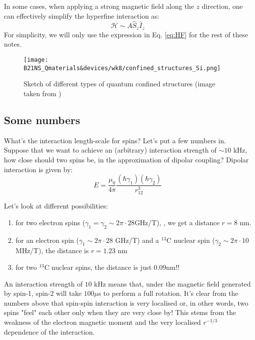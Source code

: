 \documentclass[a4paper,11pt]{article}
\begin{document}
In some cases, when applying a strong magnetic field along the $z$ direction, one can effectively simplify the hyperfine interaction as:
\begin{equation}
    \mathcal{H} \sim A \hat{S}_z \hat{I}_z
    \label {eq:HF}
\end{equation}
For simplicity, we will only use the expression in Eq. \ref{eq:HF} for the rest of these notes.

\begin{figure}[h]
\centering
\texttt{[image: B21NS\_Qmaterials\&devices/wk8/confined\_structures\_Si.png]}
\caption{Sketch of different types of quantum confined structures (image taken from \cite{zwanenburg_silicon_2013})}
\label{fig:confined}
\end{figure}

\subsection{Some numbers}
What's the interaction length-scale for spins? Let's put a few numbers in. Suppose that we want to achieve an (arbitrary) interaction strength of $\sim 10$ kHz, how close should two spins be, in the approximation of dipolar coupling? Dipolar interaction is given by:
\begin{equation}
E = \frac{\mu_0}{4\pi}\frac{ (\hbar \gamma_1) (\hbar \gamma_2)}{r_{12}^3}    
\end{equation}

Let's look at different possibilities:
\begin{enumerate}
    \item for two electron spins ($\gamma_1 = \gamma_2 \sim 2\pi \cdot 28 $GHz/T), , we get a distance $r = 8$ nm.
    \item for an electron spin ($\gamma_1 \sim 2\pi \cdot 28$ GHz/T) and a $^{13}$C nuclear spin ($\gamma_2 \sim 2\pi \cdot 10$ MHz/T), the distance is $r = 1.23$ nm
    \item for two $^{13}$C nuclear spins, the distance is just $0.09$nm!! 
\end{enumerate}

An interaction strength of $10$ kHz means that, under the magnetic field generated by spin-1, spin-2 will take $100 \mu$s to perform a full rotation. It's clear from the numbers above that spin-spin interaction is very localised or, in other words, two spins "feel" each other only when they are very close by! This stems from the weakness of the electron magnetic moment and the very localised $r^{-1/3}$ dependence of the interaction.
\end{document}
